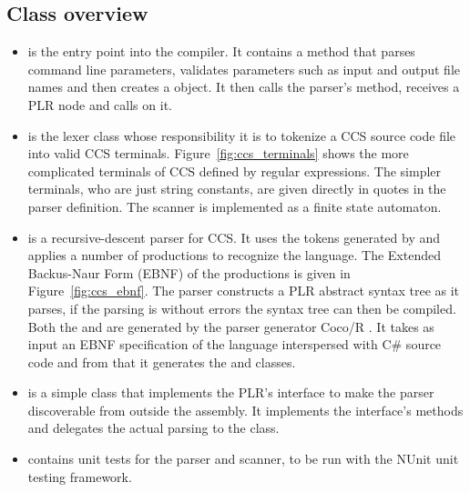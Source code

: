 \subsection{Class overview}\label{ccs_class_overview}
	\begin{itemize}
	
	\item {} is the entry point into the compiler. It contains a 
	 method that parses command line parameters, validates 
	parameters such as input and output file names and then creates a 
	 object. It then calls the parser's  method, 
	receives a PLR  node and calls  on it. 
	
	\item {} is the lexer class whose responsibility it is to 
	tokenize a CCS source code file into valid CCS terminals. 
	Figure~\ref{fig:ccs_terminals} shows the more complicated terminals of CCS 
	defined by regular expressions. The simpler terminals, who are just string 
	constants, are given directly in quotes in the parser definition. The 
	scanner is implemented as a finite state automaton.
	
  \item {} is a recursive-descent parser for CCS. It uses the 
  tokens generated by  and applies a number of 
  productions to recognize the language. The Extended Backus-Naur 
  Form (EBNF) of the productions is given in Figure~\ref{fig:ccs_ebnf}. The 
  parser constructs a PLR abstract syntax tree as it parses, if the parsing is 
  without errors the syntax tree can then be compiled. Both the 
   and  are generated by the parser generator 
  Coco/R \cite{cocor}. It takes as input an EBNF specification of the language 
  interspersed with C\# source code and from that it generates the 
   and  classes. 
	
	\item {} is a simple class that implements the PLR's 
	 interface to make the parser discoverable from outside the 
	assembly. It implements the interface's methods and delegates the actual
	parsing to the  class.
	
	\item {} contains unit tests for the parser and scanner, to 
	be run with the NUnit unit testing framework.
	
	\end{itemize}
	
